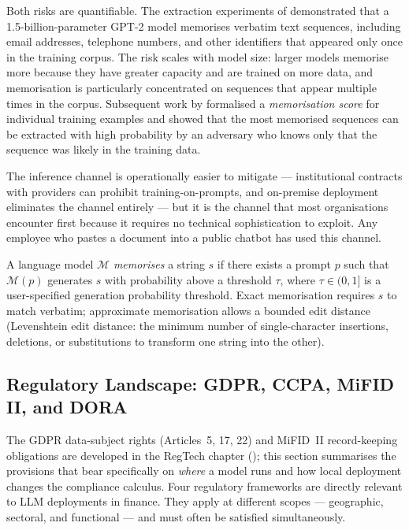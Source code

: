 Both risks are quantifiable. The extraction experiments of \citet{carlini2021extracting} demonstrated that a 1.5-billion-parameter GPT-2 model memorises verbatim text sequences, including email addresses, telephone numbers, and other identifiers that appeared only once in the training corpus. The risk scales with model size: larger models memorise more because they have greater capacity and are trained on more data, and memorisation is particularly concentrated on sequences that appear multiple times in the corpus. Subsequent work by \citet{carlini2022quantifying} formalised a \emph{memorisation score} for individual training examples and showed that the most memorised sequences can be extracted with high probability by an adversary who knows only that the sequence was likely in the training data.

The inference channel is operationally easier to mitigate — institutional contracts with providers can prohibit training-on-prompts, and on-premise deployment eliminates the channel entirely — but it is the channel that most organisations encounter first because it requires no technical sophistication to exploit. Any employee who pastes a document into a public chatbot has used this channel.

\begin{definition}[Memorisation]
\label{def:memorisation}
A language model $\mathcal{M}$ \emph{memorises} a string $s$ if there exists a prompt $p$ such that $\mathcal{M}(p)$ generates $s$ with probability above a threshold $\tau$, where $\tau \in (0,1]$ is a user-specified generation probability threshold. Exact memorisation requires $s$ to match verbatim; approximate memorisation allows a bounded edit distance (Levenshtein edit distance: the minimum number of single-character insertions, deletions, or substitutions to transform one string into the other).
\end{definition}

\subsection{Regulatory Landscape: GDPR, CCPA, MiFID II, and DORA}
\label{sec:ch15-regulation}

The GDPR data-subject rights (Articles~5, 17, 22) and MiFID~II record-keeping
obligations are developed in the RegTech chapter (); this
section summarises the provisions that bear specifically on \emph{where} a model runs and
how local deployment changes the compliance calculus.
Four regulatory frameworks are directly relevant to LLM deployments in finance. They apply at different scopes — geographic, sectoral, and functional — and must often be satisfied simultaneously.

